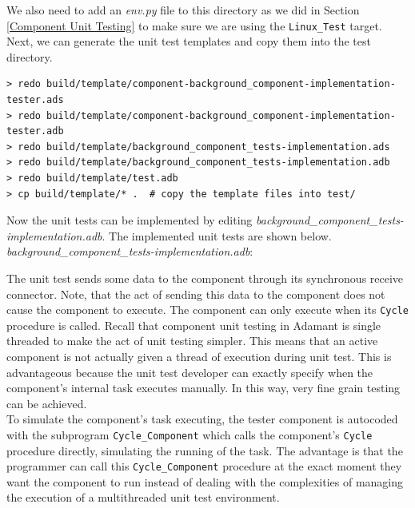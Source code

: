 We also need to add an \textit{env.py} file to this directory as we did in Section \ref{Component Unit Testing} to make sure we are using the \texttt{Linux\_Test} target. \\

Next, we can generate the unit test templates and copy them into the test directory.

\vspace{5mm} %
\begin{verbatim}
> redo build/template/component-background_component-implementation-tester.ads
> redo build/template/component-background_component-implementation-tester.adb
> redo build/template/background_component_tests-implementation.ads
> redo build/template/background_component_tests-implementation.adb
> redo build/template/test.adb
> cp build/template/* .  # copy the template files into test/
\end{verbatim}
\vspace{5mm} %

Now the unit tests can be implemented by editing \textit{background\_component\_tests-implementation.adb}. The implemented unit tests are shown below. \\

\textit{background\_component\_tests-implementation.adb}:

The unit test sends some data to the component through its synchronous receive connector. Note, that the act of sending this data to the component does not cause the component to execute. The component can only execute when its \texttt{Cycle} procedure is called. Recall that component unit testing in Adamant is single threaded to make the act of unit testing simpler. This means that an active component is not actually given a thread of execution during unit test. This is advantageous because the unit test developer can exactly specify when the component's internal task executes manually. In this way, very fine grain testing can be achieved. \\

To simulate the component's task executing, the tester component is autocoded with the subprogram \texttt{Cycle\_Component} which calls the component's \texttt{Cycle} procedure directly, simulating the running of the task. The advantage is that the programmer can call this \texttt{Cycle\_Component} procedure at the exact moment they want the component to run instead of dealing with the complexities of managing the execution of a multithreaded unit test environment. \\

